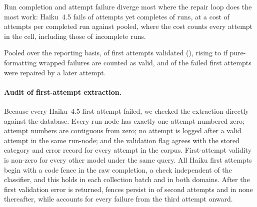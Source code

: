 Run completion and attempt failure diverge most where the repair loop does
the most work: Haiku~4.5 fails  of
attempts yet completes  of
runs, at a cost of
 attempts per
completed run against 
pooled, where the cost counts every attempt in the cell, including those
of incomplete runs.

\begin{table}[htbp]
\centering\scriptsize
\caption{First attempts by node: valid first attempts over run-nodes
reaching the node, the same after fence removal, and the composition of
failed first attempts. The denominator depends on upstream success, so the
identify node is the only unconditioned comparison. \emph{Retry} rows give
failed first attempts that a later attempt repaired.}
\label{tab:firstattempt}
\resizebox{\linewidth}{!}{}
\end{table}

Pooled over the reporting basis,  of
 first attempts validated
(), rising to
 if pure-formatting wrapped
failures are counted as valid, and 
of the  failed first attempts were repaired
by a later attempt.

\paragraph{Audit of first-attempt extraction.}
Because every Haiku~4.5 first attempt failed, we checked the extraction
directly against the database. Every run-node has exactly one attempt
numbered zero; attempt numbers are contiguous from zero; no attempt is
logged after a valid attempt in the same run-node; and the validation flag
agrees with the stored category and error record for every attempt in the
corpus. First-attempt validity is non-zero for every other model under the
same query. All  Haiku first
attempts begin with a code fence in the raw completion, a check independent
of the classifier, and this holds in each collection batch and in both
domains. After the first validation error is returned, fences persist in
 of
 second attempts and in none
thereafter, while  accounts for every failure from the
third attempt onward.

